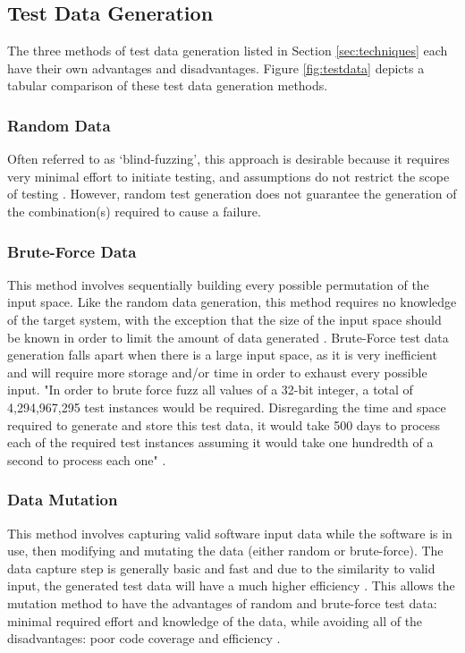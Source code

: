 \documentclass[10pt, final, journal, letterpaper, twoside, twocolumn]{IEEEtran}
\begin{document}
	\subsection{Test Data Generation}
		The three methods of test data generation listed in Section \ref{sec:techniques} each have their own advantages and disadvantages. Figure \ref{fig:testdata} depicts a tabular comparison of these test data generation methods.
		
		\subsubsection{\label{sec:random}Random Data}
			Often referred to as `blind-fuzzing', this approach is desirable because it requires very minimal effort to initiate testing, and assumptions do not restrict the scope of testing \cite{clarke}. However, random test generation does not guarantee the generation of the combination(s) required to cause a failure. 
			
		\subsubsection{Brute-Force Data}
			This method involves sequentially building every possible permutation of the input space. Like the random data generation, this method requires no knowledge of the target system, with the exception that the size of the input space should be known in order to limit the amount of data generated \cite{clarke}. Brute-Force test data generation falls apart when there is a large input space, as it is very inefficient and will require more storage and/or time in order to exhaust every possible input. "In order to brute force fuzz all values of a 32-bit integer, a total of 4,294,967,295 test instances would be required. Disregarding the time and space required to generate and store this test data, it would take 500 days to process each of the required test instances assuming it would take one hundredth of a second to process each one" \cite{clarke}.
			
		\subsubsection{Data Mutation}
			This method involves capturing valid software input data while the software is in use, then modifying and mutating the data (either random or brute-force). The data capture step is generally basic and fast and due to the similarity to valid input, the generated test data will have a much higher efficiency \cite{clarke}. This allows the mutation method to have the advantages of random and brute-force test data: minimal required effort and knowledge of the data, while avoiding all of the disadvantages: poor code coverage and efficiency \cite{clarke}. 
	
\end{document}
